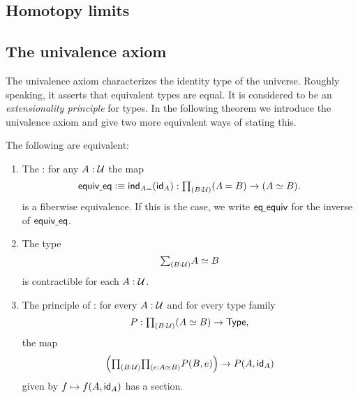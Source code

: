 \subsection{Homotopy limits}

\subsection{The univalence axiom}

The univalence axiom characterizes the identity type of the universe. Roughly speaking, it asserts that equivalent types are equal. It is considered to be an \emph{extensionality principle} for types. In the following theorem we introduce the univalence axiom and give two more equivalent ways of stating this.

\begin{thm}\label{thm:univalence}
The following are equivalent:
\begin{enumerate}
\item The : for any $A:\UU$ the map
\begin{equation*}
\equiveq\defeq \ind{A=}(\idfunc[A]) : \prd{B:\UU} (\id{A}{B})\to(\eqv{A}{B}).
\end{equation*}
is a fiberwise equivalence. If this is the case, we write
$\eqequiv$
for the inverse of $\equiveq$.
\item The type
\begin{equation*}
\sm{B:\UU}\eqv{A}{B}
\end{equation*}
is contractible for each $A:\UU$.
\item The principle of : for every $A:\UU$ and for every type family
\begin{equation*}
P:\prd{B:\UU} (\eqv{A}{B})\to \type,
\end{equation*}
the map
\begin{equation*}
\Big(\prd{B:\UU}{e:\eqv{A}{B}}P(B,e)\Big)\to P(A,\idfunc[A])
\end{equation*}
given by $f\mapsto f(A,\idfunc[A])$ has a section.
\end{enumerate}
\end{thm}

